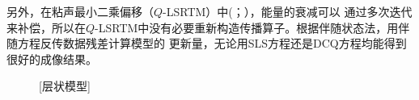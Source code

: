 另外，在粘声最小二乘偏移（$Q$-LSRTM）中(；），能量的衰减可以
通过多次迭代来补偿，所以在$Q$-LSRTM中没有必要重新构造传播算子。根据伴随状态法，用伴随方程反传数据残差计算模型的
更新量，无论用SLS方程还是DCQ方程均能得到很好的成像结果。
\begin{figure}[!htbp]
	    \centering
		\label{fig:lens_v}
\end{figure}
